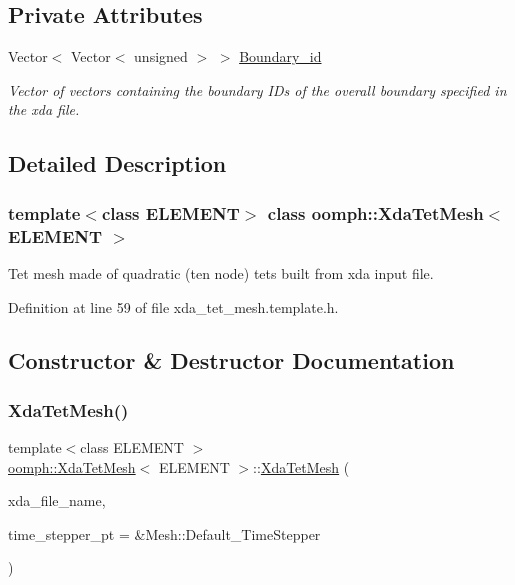\subsection*{Private Attributes}
\begin{DoxyCompactItemize}
\item 
Vector$<$ Vector$<$ unsigned $>$ $>$ \hyperlink{classoomph_1_1XdaTetMesh_a1774abc96e730c89e95b99933a7c0ae3}{Boundary\+\_\+id}
\begin{DoxyCompactList}\small\item\em Vector of vectors containing the boundary I\+Ds of the overall boundary specified in the xda file. \end{DoxyCompactList}\end{DoxyCompactItemize}


\subsection{Detailed Description}
\subsubsection*{template$<$class E\+L\+E\+M\+E\+NT$>$\newline
class oomph\+::\+Xda\+Tet\+Mesh$<$ E\+L\+E\+M\+E\+N\+T $>$}

Tet mesh made of quadratic (ten node) tets built from xda input file. 

Definition at line 59 of file xda\+\_\+tet\+\_\+mesh.\+template.\+h.



\subsection{Constructor \& Destructor Documentation}
\mbox{\label{classoomph_1_1XdaTetMesh_a4cea32a11d0899ac230de66899e503d1}} 
\subsubsection{\texorpdfstring{Xda\+Tet\+Mesh()}{XdaTetMesh()}}
{\footnotesize\ttfamily template$<$class E\+L\+E\+M\+E\+NT $>$ \\
\hyperlink{classoomph_1_1XdaTetMesh}{oomph\+::\+Xda\+Tet\+Mesh}$<$ E\+L\+E\+M\+E\+NT $>$\+::\hyperlink{classoomph_1_1XdaTetMesh}{Xda\+Tet\+Mesh} (\begin{DoxyParamCaption}\item[{const std\+::string}]{xda\+\_\+file\+\_\+name,  }\item[{Time\+Stepper $\ast$}]{time\+\_\+stepper\+\_\+pt = {\ttfamily \&Mesh\+:\+:Default\+\_\+TimeStepper} }\end{DoxyParamCaption})}



